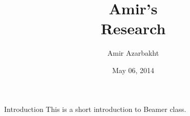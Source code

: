\documentclass{beamer}
\title[Amir Azarbakht's research]{Amir's\\Research}
\author{Amir Azarbakht}
\institute{Oregon State University}
\date{May 06, 2014}
\begin{document}
\begin{frame}
\titlepage
\end{frame}


\begin{frame}{Introduction}
This is a short introduction to Beamer class.
\end{frame}
\end{document}
